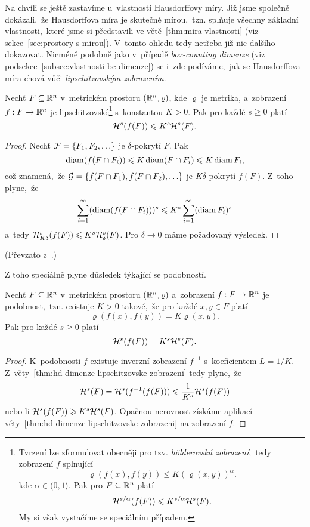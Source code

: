 Na chvíli se ještě zastavíme u~vlastností Hausdorffovy míry. Již jsme společně dokázali,~že Hausdorffova míra je skutečně mírou,~tzn. splňuje všechny základní vlastnosti,~které jsme si představili ve větě~\ref{thm:mira-vlastnosti} (viz sekce~\ref{sec:prostory-s-mirou}). V~tomto ohledu tedy netřeba již nic dalšího dokazovat. Nicméně podobně jako v~případě \emph{box-counting dimenze} (viz podsekce~\ref{subsec:vlastnosti-bc-dimenze}) se i~zde podíváme,~jak se Hausdorffova míra chová vůči \emph{lipschitzovským zobrazením}.
\begin{theorem}\label{thm:hd-dimenze-lipschitzovske-zobrazeni}
    Nechť $F\subseteq\R^n$ v~metrickém prostoru $(\R^n,\varrho)$, kde $\varrho$ je metrika, a~zobrazení $\mapping{f}{F}{\R^n}$ je lipschitzovské\footnote{Tvrzení lze zformulovat obecněji pro tzv. \emph{hölderovská zobrazení},~tedy zobrazení $f$ splnující
    \[\varrho(f(x),f(y))\leqslant K(\varrho(x,y))^\alpha.\]
    kde $\alpha\in(0,1\rangle$. Pak pro $F\subseteq\R^n$ platí
    \[\hausdorffmeasure{s/\alpha}(f(F))\leqslant K^{s/\alpha}\hausdorffmeasure{s}(F).\]
    My si však vystačíme se speciálním případem.} s~konstantou $K>0$. Pak pro každé $s\geqslant 0$ platí
    \[\hausdorffmeasure{s}(f(F))\leqslant K^s\hausdorffmeasure{s}(F).\]
\end{theorem}
\begin{proof}
    Nechť $\mathcal{F}=\set{F_1,F_2,\ldots}$ je $\delta$-pokrytí $F$. Pak
    \[\diam(f(F\cap F_i))\leqslant K\diam(F\cap F_i)\leqslant K\diam{F_i},\]
    což znamená,~že $\mathcal{G}=\set{f(F\cap F_1),f(F\cap F_2),\ldots}$ je $K\delta$-pokrytí $f(F)$. Z~toho plyne,~že
    \[\sum_{i=1}^{\infty}(\diam(f(F\cap F_i)))^s\leqslant K^s\sum_{i=1}^{\infty}(\diam{F_i})^s\]
    a~tedy $\hausdorffdeltameasure{s}{K\delta}(f(F))\leqslant K^s\hausdorffdeltameasure{s}{\delta}(F)$. Pro $\delta\to 0$ máme požadovaný výsledek.
\end{proof}
(Převzato z~\citep[str. 46]{Falconer2014}.)

Z toho speciálně plyne důsledek týkající se podobností.
\begin{corollary}\label{cor:hd-dimenze-podobnost}
    Nechť $F\subseteq\R^n$ v~metrickém prostoru $(\R^n,\varrho)$ a~zobrazení $\mapping{f}{F}{\R^n}$ je podobnost,~tzn. existuje $K>0$ takové,~že pro každé $x,y\in F$ platí
    \[\varrho(f(x),f(y))=K\varrho(x,y).\]
    Pak pro každé $s\geqslant 0$ platí
    \[\hausdorffmeasure{s}(f(F))=K^s\hausdorffmeasure{s}(F).\]
\end{corollary}
\begin{proof}
    K~podobnosti $f$ existuje inverzní zobrazení $f^{-1}$ s~koeficientem $L=1/K$. Z~věty~\ref{thm:hd-dimenze-lipschitzovske-zobrazeni} tedy plyne,~že
    \[\hausdorffmeasure{s}(F)=\hausdorffmeasure{s}(f^{-1}(f(F)))\leqslant\dfrac{1}{K^s}\hausdorffmeasure{s}(f(F))\]
    nebo-li $\hausdorffmeasure{s}(f(F))\geqslant K^s\hausdorffmeasure{s}(F)$. Opačnou nerovnost získáme aplikací věty~\ref{thm:hd-dimenze-lipschitzovske-zobrazeni} na zobrazení $f$.
\end{proof}

